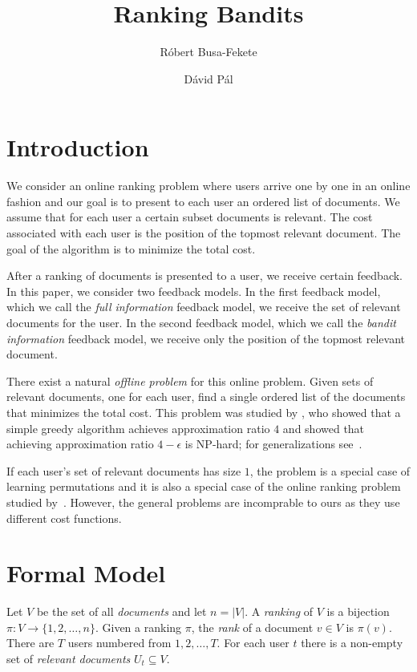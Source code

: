 \documentclass{article}
\begin{document}
\title{Ranking Bandits}
\author{R\'obert Busa-Fekete \and D\'avid P\'al}
\maketitle

\section{Introduction}

We consider an online ranking problem where users arrive one by one in an online
fashion and our goal is to present to each user an ordered list of documents. We
assume that for each user a certain subset documents is relevant. The cost
associated with each user is the position of the topmost relevant document. The
goal of the algorithm is to minimize the total cost.

After a ranking of documents is presented to a user, we receive certain
feedback. In this paper, we consider two feedback models. In the first feedback
model, which we call the \emph{full information} feedback model, we receive the
set of relevant documents for the user. In the second feedback model, which we
call the \emph{bandit information} feedback model, we receive only the position
of the topmost relevant document.

There exist a natural \emph{offline problem} for this online problem. Given sets
of relevant documents, one for each user, find a single ordered list of the
documents that minimizes the total cost. This problem was studied by
\cite{Feige-Lovasz-Tetali-2004}, who showed that a simple greedy algorithm
achieves approximation ratio $4$ and showed that achieving approximation ratio
$4-\epsilon$ is NP-hard; for generalizations see~\cite{Azar-Gamzu-Yin-2009}.

If each user's set of relevant documents has size $1$, the problem is a special
case of learning permutations \citep{Helmbold-Warmuth-2009,
Yasutake-Hatano-Kijima-Takimoto-Takeda-2011} and it is also a special case of
the online ranking problem studied by~\cite{Ailon-2014}. However, the general
problems are incomprable to ours as they use different cost functions.

\section{Formal Model}

Let $V$ be the set of all \emph{documents} and let $n = |V|$. A \emph{ranking}
of $V$ is a bijection $\pi:V \to \{1,2,\dots,n\}$. Given a ranking $\pi$, the
\emph{rank} of a document $v \in V$ is $\pi(v)$. There are $T$ users numbered
from $1,2,\dots,T$. For each user $t$ there is a non-empty set of \emph{relevant
documents} $U_t \subseteq V$.
\end{document}
